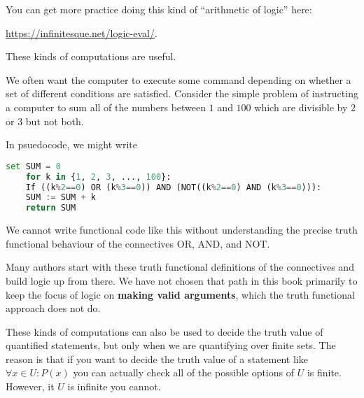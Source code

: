 You can get more practice doing this kind of ``arithmetic of logic'' here:

\begin{center}
 \url{https://infinitesque.net/logic-eval/}.
 \end{center}


\newpage

These kinds of computations are useful.

We often want the computer to execute some command depending on whether a set of different conditions are satisfied.  Consider the simple problem of instructing a computer to sum all of the numbers between $1$ and $100$ which are divisible by $2$ or $3$ but not both.

In psuedocode, we might write

\begin{lstlisting}[language=Python]
	set SUM = 0
	for k in {1, 2, 3, ..., 100}:
	If ((k%2==0) OR (k%3==0)) AND (NOT((k%2==0) AND (k%3==0))):
	SUM := SUM + k 
	return SUM
\end{lstlisting}

We cannot write functional code like this without understanding the precise truth functional behaviour of the connectives OR, AND, and NOT.

Many authors start with these truth functional definitions of the connectives and build logic up from there.  We have not chosen that path in this book primarily to keep the focus of logic on \textbf{making valid arguments}, which the truth functional approach does not do.

These kinds of computations can also be used to decide the truth value of quantified statements, but only when we are quantifying over finite sets.  The reason is that if you want to decide the truth value of a statement like $\forall x \in U: P(x)$ you can actually check all of the possible options of $U$ is finite.  However, it $U$ is infinite you cannot.

